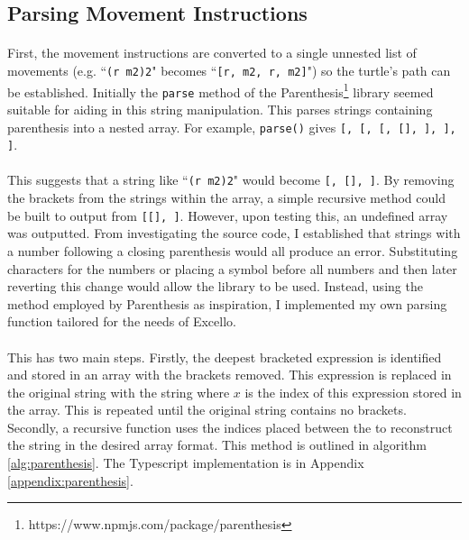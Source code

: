 \subsection{Parsing Movement Instructions}

\paragraph{} First, the movement instructions are converted to a single unnested list of movements (e.g. ``\texttt{(r m2)2}" becomes ``\texttt{[r, m2, r, m2]}") so the turtle's path can be established. Initially  the \texttt{parse} method of the Parenthesis\footnote{https://www.npmjs.com/package/parenthesis} library seemed suitable for aiding in this string manipulation. This parses strings containing parenthesis into a nested array. For example, \texttt{parse()} gives \texttt{[, [\upquote{b[}, [, [], \upquote{\}}], \upquote{]}], \upquote{)}]}.

\paragraph{} This suggests that a string like ``\texttt{(r m2)2}" would become \texttt{[\upquote{(}, [], ]}.  By removing the brackets from the strings within the array, a simple recursive method could be built to output \texttt{} from \texttt{[[], ]}. However, upon testing this, an undefined array was outputted. From investigating the source code, I established that strings with a number following a closing parenthesis would all produce an error. Substituting characters for the numbers or placing a symbol before all numbers and then later reverting this change would allow the library to be used. Instead, using the method employed by Parenthesis as inspiration, I implemented my own parsing function tailored for the needs of Excello.

\paragraph{} This has two main steps. Firstly, the deepest bracketed expression is identified and stored in an array with the brackets removed. This expression is replaced in the original string with the string  where $x$ is the index of this expression stored in the array. This is repeated until the original string contains no brackets. Secondly, a recursive function uses the indices placed between the \texttt{\upquote{\_\_\_}} to reconstruct the string in the desired array format. This method is outlined in algorithm \ref{alg:parenthesis}. The Typescript implementation is in Appendix \ref{appendix:parenthesis}.

